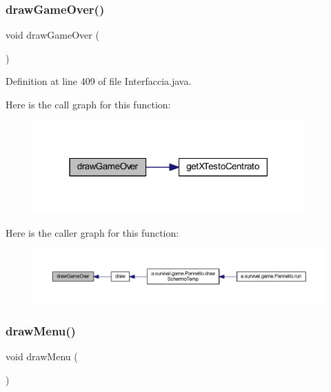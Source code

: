 \subsubsection{\texorpdfstring{draw\+Game\+Over()}{drawGameOver()}}
{\footnotesize\ttfamily void draw\+Game\+Over (\begin{DoxyParamCaption}{ }\end{DoxyParamCaption})}



Definition at line 409 of file Interfaccia.\+java.

Here is the call graph for this function\+:
\nopagebreak
\begin{figure}[H]
\begin{center}
\leavevmode
\includegraphics[width=295pt]{classa_1_1survival_1_1game_1_1_interfaccia_aeb2c7e9c7d14c9eccb7e624bd9611ef8_cgraph}
\end{center}
\end{figure}
Here is the caller graph for this function\+:
\nopagebreak
\begin{figure}[H]
\begin{center}
\leavevmode
\includegraphics[width=350pt]{classa_1_1survival_1_1game_1_1_interfaccia_aeb2c7e9c7d14c9eccb7e624bd9611ef8_icgraph}
\end{center}
\end{figure}
\mbox{\label{classa_1_1survival_1_1game_1_1_interfaccia_aa13653318c21b0e6b86838e6091bfc9a}} 
\subsubsection{\texorpdfstring{draw\+Menu()}{drawMenu()}}
{\footnotesize\ttfamily void draw\+Menu (\begin{DoxyParamCaption}{ }\end{DoxyParamCaption})}



